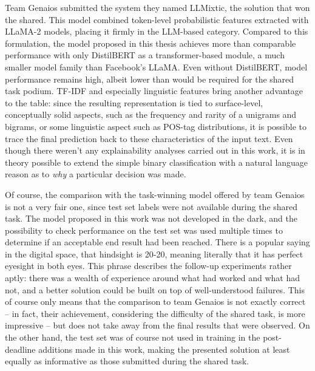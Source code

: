 Team Genaios \citep{sarvazyan-etal-2024-genaios} submitted the system they named LLMixtic, the solution that won the shared.
This model combined token-level probabilistic features extracted with LLaMA-2 models, placing it firmly in the LLM-based category.
Compared to this formulation, the model proposed in this thesis achieves more than comparable performance with only DistilBERT as a transformer-based module, a much smaller model family than Facebook's LLaMA.
Even without DistilBERT, model performance remains high, albeit lower than would be required for the shared task podium.
TF-IDF and especially linguistic features bring another advantage to the table: since the resulting representation is tied to surface-level, conceptually solid aspects, such as the frequency and rarity of a unigrams and bigrams, or some linguistic aspect such as POS-tag distributions, it is possible to trace the final prediction back to these characteristics of the input text.
Even though there weren't any explainability analyses carried out in this work, it is in theory possible to extend the simple binary classification with a natural language reason as to \emph{why} a particular decision was made.

Of course, the comparison with the task-winning model offered by team Genaios is not a very fair one, since test set labels were not available during the shared task.
The model proposed in this work was not developed in the dark, and the possibility to check performance on the test set was used multiple times to determine if an acceptable end result had been reached.
There is a popular saying in the digital space, that hindsight is 20-20, meaning literally that it has perfect eyesight in both eyes.
This phrase describes the follow-up experiments rather aptly: there was a wealth of experience around what had worked and what had not, and a better solution could be built on top of well-understood failures.
This of course only means that the comparison to team Genaios is not exactly correct -- in fact, their achievement, considering the difficulty of the shared task, is more impressive -- but does not take away from the final results that were observed.
On the other hand, the test set was of course not used in training in the post-deadline additions made in this work, making the presented solution at least equally as informative as those submitted during the shared task.


